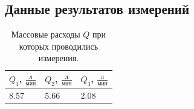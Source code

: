 \documentclass[12pt]{article}
\begin{document}
\subsection{Данные результатов измерений} \label{app_2}
\begin{table}[H]
    \centering
    \begin{tabular}{|l|l|l|}
        \hline
        $Q_1$, $\frac{\textrm{л}}{\textrm{мин}}$ & $Q_2$, $\frac{\textrm{л}}{\textrm{мин}}$ & $Q_3$, $\frac{\textrm{л}}{\textrm{мин}}$ \\
        \hline
        8.57                            & 5.66                            & 2.08 \\
        \hline
    \end{tabular}
    \caption{Массовые расходы $Q$ при которых проводились измерения.}
    \label{tab:1}
\end{table}
\end{document}
